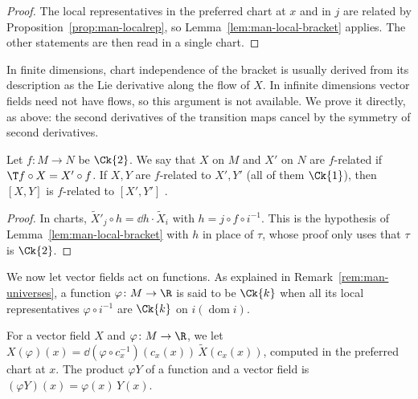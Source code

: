 \begin{proof}
  \leanok
  The local representatives in the preferred chart at $x$ and in $j$ are related by
  Proposition~\ref{prop:man-localrep}, so Lemma~\ref{lem:man-local-bracket} applies. The other
  statements are then read in a single chart.
\end{proof}

\begin{remark}[No flows]
  \label{rem:man-no-flows}
  In finite dimensions, chart independence of the bracket is usually derived from its
  description as the Lie derivative along the flow of $X$. In infinite dimensions vector fields
  need not have flows, so this argument is not available. We prove it directly, as above: the
  second derivatives of the transition maps cancel by the symmetry of second derivatives.
\end{remark}

\begin{theorem}
  \label{thm:man-related}
  \leanok
  Let $f \colon M \to N$ be $\Ck{2}$. We say that $X$ on $M$ and $X'$ on $N$ are $f$-related if
  $\T f \circ X = X' \circ f$. If $X, Y$ are $f$-related to $X', Y'$ (all of them $\Ck{1}$), then
  $[X, Y]$ is $f$-related to $[X', Y']$ \cite[\S V.1]{Lan99}.
\end{theorem}

\begin{proof}
  \leanok
  In charts, $\widetilde{X}'_j \circ h = \dd h \cdot \widetilde{X}_i$ with $h = j \circ f \circ
  i^{-1}$. This is the hypothesis of Lemma~\ref{lem:man-local-bracket} with $h$ in place of
  $\tau$, whose proof only uses that $\tau$ is $\Ck{2}$.
\end{proof}

We now let vector fields act on functions. As explained in Remark~\ref{rem:man-universes}, a
function $\varphi \colon M \to \R$ is said to be $\Ck{k}$ when all its local representatives
$\varphi \circ i^{-1}$ are $\Ck{k}$ on $i(\operatorname{dom} i)$.

\begin{definition}
  \label{def:man-vf-deriv}
  \leanok
  For a vector field $X$ and $\varphi \colon M \to \R$, we let
  $X(\varphi)(x) = \dd(\varphi \circ c_x^{-1})(c_x(x))\,\widetilde{X}(c_x(x))$, computed in the
  preferred chart at $x$. The product $\varphi Y$ of a function and a vector field is
  $(\varphi Y)(x) = \varphi(x)\,Y(x)$.
\end{definition}

